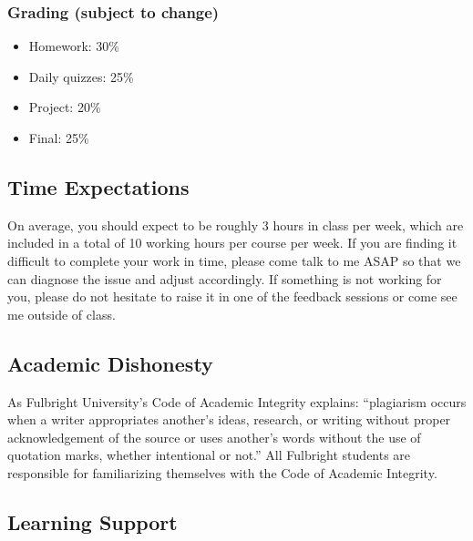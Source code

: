 \documentclass[
]{article}
\providecommand{\tightlist}{%
  \setlength{\itemsep}{0pt}\setlength{\parskip}{0pt}}
\begin{document}
\hypertarget{grading-subject-to-change}{%
\subsubsection*{Grading (subject to change)}\label{grading-subject-to-change}}

\begin{itemize}
\tightlist
\item
  Homework: 30\%
\item
  Daily quizzes: 25\%
\item
  Project: 20\%
\item
  Final: 25\%
\end{itemize}

\hypertarget{time-expectations}{%
\subsection*{Time Expectations}\label{time-expectations}}

On average, you should expect to be roughly 3 hours in class per week, which are included in a total of 10 working hours per course per week. If you are finding it difficult to complete your work in time, please come talk to me ASAP so that we can diagnose the issue and adjust accordingly. If something is not working for you, please do not hesitate to raise it in one of the feedback sessions or come see me outside of class.

\hypertarget{academic-dishonesty}{%
\subsection*{Academic Dishonesty}\label{academic-dishonesty}}

As Fulbright University's Code of Academic Integrity explains: ``plagiarism occurs when a writer appropriates another's ideas, research, or writing without proper acknowledgement of the source or uses another's words without the use of quotation marks, whether intentional or not.'' All Fulbright students are responsible for familiarizing themselves with the Code of Academic Integrity.

\hypertarget{learning-support}{%
\subsection*{Learning Support}\label{learning-support}}
\end{document}
